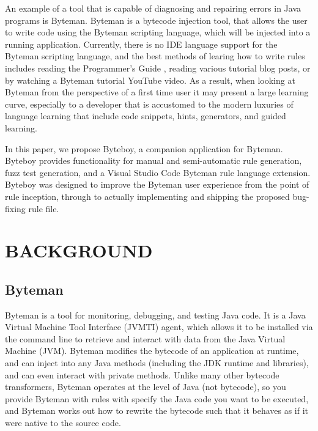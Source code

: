 \documentclass[letterpaper,twocolumn,10pt]{article}
\begin{document}
An example of a tool that is capable of diagnosing and repairing errors in Java programs is Byteman\cite{bytemanwebsite}. Byteman is a bytecode injection tool, that allows the user to write code using the Byteman scripting language, which will be injected into a running application. Currently, there is no IDE language support for the Byteman scripting language, and the best methods of learing how to write rules includes reading the Programmer's Guide \cite{bytemanguide}, reading various tutorial blog posts\cite{bytemanblog}, or by watching a Byteman tutorial YouTube video\cite{bytemanvideo}. As a result, when looking at Byteman from the perspective of a first time user it may present a large learning curve, especially to a developer that is accustomed to the modern luxuries of language learning that include code snippets, hints, generators\cite{yoman}, and guided learning.

In this paper, we propose Byteboy\cite{byteboy}, a companion application for Byteman. Byteboy provides functionality for manual and semi-automatic rule generation, fuzz test generation, and a Visual Studio Code Byteman rule language extension. Byteboy was designed to improve the Byteman user experience from the point of rule inception, through to actually implementing and shipping the proposed bug-fixing rule file.



\section{BACKGROUND}

\subsection{Byteman}

Byteman is a tool for monitoring, debugging, and testing Java code\cite{bytemanwebsite}. It is a Java Virtual Machine Tool Interface (JVMTI) agent, which allows it to be installed via the command line to retrieve and interact with data from the Java Virtual Machine (JVM). Byteman modifies the bytecode of an application at runtime, and can inject into any Java methods (including the JDK runtime and libraries), and can even interact with private methods\cite{bytemanwebsite}. Unlike many other bytecode transformers, Byteman operates at the level of Java (not bytecode), so you provide Byteman with rules with specify the Java code you want to be executed, and Byteman works out how to rewrite the bytecode such that it behaves as if it were native to the source code\cite{bytemanwebsite}.
\end{document}
